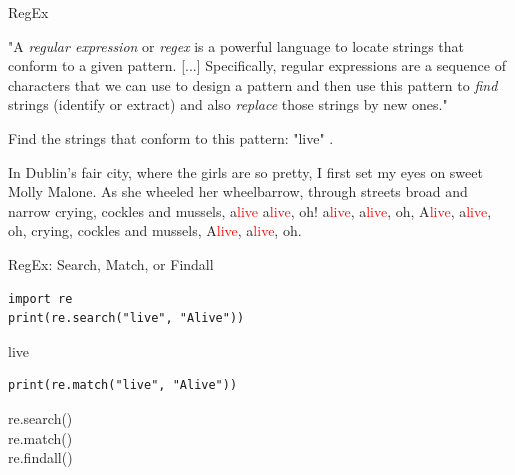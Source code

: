 \documentclass[handout]{beamer}
\begin{document}
\begin{frame}[fragile]{RegEx}
	
	"A \textit{regular expression} or \textit{regex} is a powerful language to locate strings that conform to a given pattern. [...] Specifically, regular expressions are a sequence of characters that we can use to design a pattern and then use this pattern to \textit{find} strings (identify or extract) and also \textit{replace} those strings by new ones." \\
	\begin{tiny}
		\cite{van_atteveldt_computational_2022} 
	\end{tiny}
	

\end{frame}



\begin{frame}
	
	Find the strings that conform to this pattern: "live" . 
	
	In Dublin's fair city, where the girls are so pretty, I first set my eyes on sweet Molly Malone. As she wheeled her wheelbarrow, through streets broad and narrow crying, cockles and mussels, a\textcolor{red}{live} a\textcolor{red}{live}, oh! a\textcolor{red}{live}, a\textcolor{red}{live}, oh, A\textcolor{red}{live}, a\textcolor{red}{live}, oh, crying, cockles and mussels, A\textcolor{red}{live}, a\textcolor{red}{live}, oh.
\end{frame}



\begin{frame}[fragile]{RegEx: Search, Match, or Findall}
	
\begin{lstlisting}
import re
print(re.search("live", "Alive"))
\end{lstlisting}
	
\begin{lstlistingoutput}
live
\end{lstlistingoutput}

\begin{lstlisting}
print(re.match("live", "Alive"))
\end{lstlisting}

\begin{lstlistingoutput}
 
\end{lstlistingoutput}


re.search() \\
re.match() \\
re.findall()

	
\end{frame}
\end{document}
